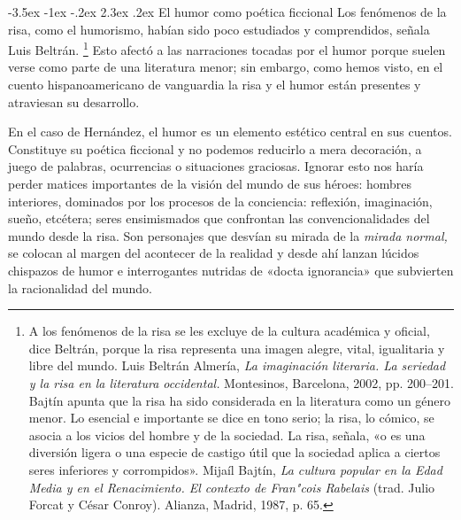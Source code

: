 \documentclass[14pt,twoside,final]{extbook} %
\makeatletter
\let\oldfootnote\footnote
\renewcommand\footnote[1]{%
\oldfootnote{\hspace{1mm}#1}}
\renewcommand\section{\@startsection {section}{1}{\z@}%
                                     {-3.5ex \@plus -1ex \@minus -.2ex}%
                                     {2.3ex \@plus .2ex}%
                                     {\normalfont\large\bfseries\sc}}
\makeatother
\begin{document}
\section{El humor como poética ficcional}\label{sec:el-humor-como-poetica-ficcional}
Los fenómenos de la risa, como el humorismo, habían sido poco estudiados y comprendidos, señala Luis Beltrán.\footnote{A los fenómenos de la risa se les excluye de la cultura académica y oficial, dice Beltrán, porque la risa representa una imagen alegre, vital, igualitaria y libre del mundo. Luis Beltrán Almería, \emph{La imaginación literaria. La seriedad y la risa en la literatura occidental.} Montesinos, Barcelona, 2002, pp. 200--201. Bajtín apunta que la risa ha sido considerada en la literatura como un género menor. Lo esencial e importante se dice en tono serio; la risa, lo cómico, se asocia a los vicios del hombre y de la sociedad. La risa, señala, «o es una diversión ligera o una especie de castigo útil que la sociedad aplica a ciertos seres inferiores y corrompidos». Mijaíl Bajtín, \emph{La cultura popular en la Edad Media y en el Renacimiento. El contexto de Fran"cois Rabelais} (trad. Julio Forcat y César Conroy). Alianza, Madrid, 1987, p. 65.} Esto afectó a las narraciones tocadas por el humor porque suelen verse como parte de una literatura menor; sin embargo, como hemos visto, en el cuento hispanoamericano de vanguardia la risa y el humor están presentes y atraviesan su desarrollo.

En el caso de Hernández, el humor es un elemento estético central en sus cuentos. Constituye su poética ficcional y no podemos reducirlo a mera decoración, a juego de palabras, ocurrencias o situaciones graciosas. Ignorar esto nos haría perder matices importantes de la visión del mundo de sus héroes: hombres interiores, dominados por los procesos de la conciencia: reflexión, imaginación, sueño, etcétera; seres ensimismados que confrontan las convencionalidades del mundo desde la risa. Son personajes que desvían su mirada de la \emph{mirada normal,} se colocan al margen del acontecer de la realidad y desde ahí lanzan lúcidos chispazos de humor e interrogantes nutridas de «docta ignorancia» que subvierten la racionalidad del mundo.
\end{document}

